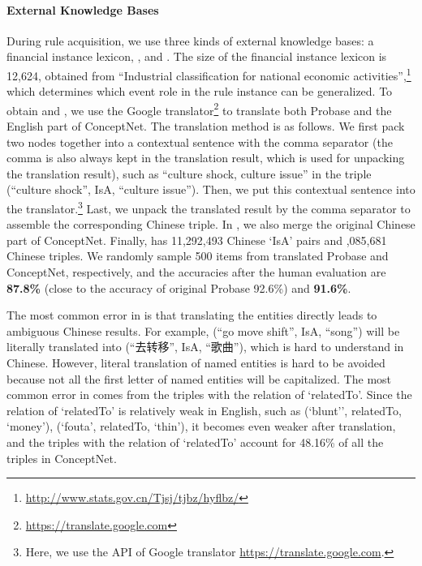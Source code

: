 
\paragraph{External Knowledge Bases}
During rule acquisition, we use three kinds of external knowledge bases: a financial instance lexicon, \zhcon, and \zhpro.
The size of the financial instance lexicon is 12,624, obtained from ``Industrial classification for national economic activities'',\footnote{\url{ http://www.stats.gov.cn/Tjsj/tjbz/hyflbz/}} which determines which event role in the rule instance can be generalized. 
To obtain \zhcon and \zhpro, we use the Google translator\footnote{\url{https://translate.google.com}} to translate both Probase and the English part of ConceptNet. 
The translation method is as follows.
We first pack two nodes together into a contextual sentence with the comma separator (the comma is also always kept in the translation result, which is used for unpacking the translation result), such as ``culture shock, culture issue'' in the triple (``culture shock'', IsA, ``culture issue'').
Then, we put this contextual sentence into the translator.\footnote{Here, we use the API of Google translator \url{https://translate.google.com}.}
Last, we unpack the translated result by the comma separator to assemble the corresponding Chinese triple.
In \zhcon, we also merge the original Chinese part of ConceptNet.
Finally, \zhpro has 11,292,493 Chinese `IsA' pairs and ,085,681 Chinese triples.
We randomly sample 500 items from translated Probase and ConceptNet, respectively, and the accuracies after the human evaluation are \textbf{87.8\%} (close to the accuracy of original Probase 92.6\%) and \textbf{91.6\%}.

The most common error in \zhpro is that translating the entities directly leads to ambiguous Chinese results.
For example, (``go move shift'', IsA, ``song'') will be literally translated into (``去转移'', IsA, ``歌曲''), which is hard to understand in Chinese. However, literal translation of named entities is hard to be avoided because not all the first letter of named entities will be capitalized.
The most common error in \zhcon comes from the triples with the relation of `relatedTo'. 
Since the relation of `relatedTo' is relatively weak in English, such as (`blunt'', relatedTo, `money'), (`fouta', relatedTo, `thin'), it becomes even weaker after translation, and the triples with the relation of `relatedTo' account for 48.16\% of all the triples in ConceptNet.

